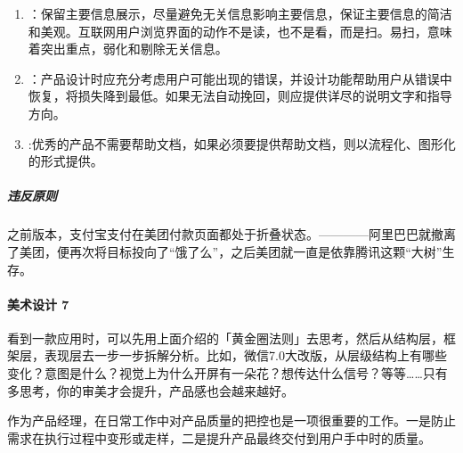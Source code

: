 \documentclass[letterpaper,11pt,english]{sphinxmanual}
\begin{document}
\begin{enumerate}
\item {} 
：保留主要信息展示，尽量避免无关信息影响主要信息，保证主要信息的简洁和美观。互联网用户浏览界面的动作不是读，也不是看，而是扫。易扫，意味着突出重点，弱化和剔除无关信息。

\item {} 
：产品设计时应充分考虑用户可能出现的错误，并设计功能帮助用户从错误中恢复，将损失降到最低。如果无法自动挽回，则应提供详尽的说明文字和指导方向。

\item {} 
:优秀的产品不需要帮助文档，如果必须要提供帮助文档，则以流程化、图形化的形式提供。

\end{enumerate}


\subparagraph{违反原则}
\label{\detokenize{chapter_idea/design:id6}}
之前版本，支付宝支付在美团付款页面都处于折叠状态。————阿里巴巴就撤离了美团，便再次将目标投向了“饿了么”，之后美团就一直是依靠腾讯这颗“大树”生存。
%
\begin{footnote}[385]\sphinxAtStartFootnote
{}
%
\end{footnote}


\paragraph{美术设计 7\sphinxfootnotemark[386]}
\label{\detokenize{chapter_idea/design:id7}}%
\begin{footnotetext}[386]\sphinxAtStartFootnote
{}
%
\end{footnotetext}\ignorespaces 
看到一款应用时，可以先用上面介绍的「黄金圈法则」去思考，然后从结构层，框架层，表现层去一步一步拆解分析。比如，微信7.0大改版，从层级结构上有哪些变化？意图是什么？视觉上为什么开屏有一朵花？想传达什么信号？等等……只有多思考，你的审美才会提升，产品感也会越来越好。
%
\begin{footnote}[387]\sphinxAtStartFootnote
{}
%
\end{footnote}

作为产品经理，在日常工作中对产品质量的把控也是一项很重要的工作。一是防止需求在执行过程中变形或走样，二是提升产品最终交付到用户手中时的质量。
\end{document}
